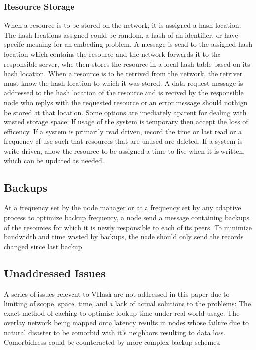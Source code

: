 \documentclass[11pt]{IEEEtran} %
\begin{document}
\subsubsection{Resource Storage}
When a resource is to be stored on the network, it is assigned a hash location. The hash locations assigned could be random, a hash of an identifier, or have specifc meaning for an embeding problem. A message is send to the assigned hash location which contains the resource and the network forwards it to the responsible server, who then stores the resource in a local hash table based on its hash location.
When a resource is to be retrived from the network, the retriver must know the hash location to which it was stored. A data request message is addressed to the hash location of the resource and is recived by the responsible node who replys with the requested resource or an error message should nothign be stored at that location. Some options are imediately aparent for dealing with wasted storage space: If usage of the system is temporary then accept the loss of efficency. If a system is primarily read driven, record the time or last read or a frequency of use such that resources that are unused are deleted. If a system is write driven, allow the resource to be assigned a time to live when it is written, which can be updated as needed.

\subsection{Backups}
At a frequency set by the node manager or at a frequency set by any adaptive process to optimize backup frequency, a node send a message containing backups of the resources for which it is newly responsible to each of its peers. To minimize bandwidth and time wasted by backups, the node should only send the records changed since last backup

\subsection{Unaddressed Issues}
A series of issues relevent to VHash are not addressed in this paper due to limiting of scope, space, time, and a lack of actual solutions to the problems: The exact method of caching to optimize lookup time under real world usage. The overlay network being mapped onto latency results in nodes whose failure due to natural disaster to be comorbid with it's neighbors resulting to data loss. Comorbidness could be counteracted by more complex backup schemes.
\end{document}
